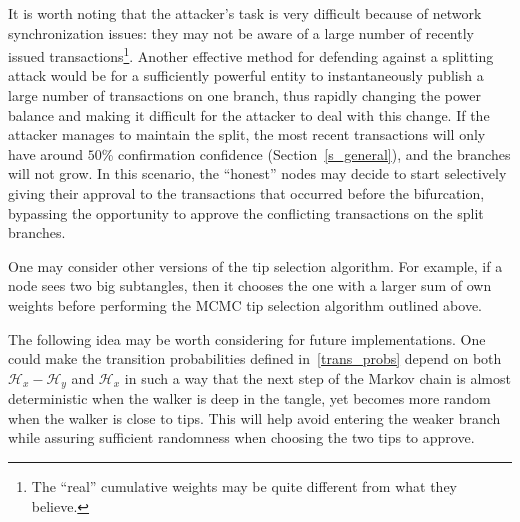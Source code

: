 \documentclass[12pt]{article}
\newcommand{\HH}{\mathcal{H}}
\begin{document}
\begin{CJK}{UTF8}{bkai}
It is worth noting that the attacker's task is very 
difficult because of network synchronization
issues: they may not be aware of a large number 
of recently issued transactions\footnote{The ``real''
cumulative weights may be quite different from 
what they believe.}. Another effective 
method for defending against a 
splitting attack would be for a sufficiently
powerful entity to instantaneously publish a large number
 of transactions on one branch, thus rapidly changing the power balance
and making it difficult for the attacker to deal with this change. 
If the attacker manages to maintain
the split, the most recent transactions will only have around $50$\%
 confirmation confidence (Section~\ref{s_general}), and the branches 
will not grow. In this scenario, the ``honest'' nodes may decide to start 
selectively giving their approval to the transactions that occurred before 
the bifurcation, bypassing the opportunity to approve the conflicting 
transactions on the split branches.

One may consider other versions of the 
tip selection algorithm. For example, if a node sees
 two big subtangles, 
then it chooses the one with a larger sum of own weights 
before performing the MCMC tip selection algorithm outlined above.

The following idea may be worth considering for future implementations. 
One could make the transition probabilities defined 
in~\eqref{trans_probs} depend 
on both $\HH_x-\HH_y$ and $\HH_x$ in such a 
way that the next step of the Markov chain is almost deterministic
when the walker is deep in the tangle, yet becomes more 
random when the walker is close to tips. This will help avoid entering the 
weaker branch while assuring sufficient randomness when choosing the 
two tips to approve.




\end{CJK}
\end{document}
